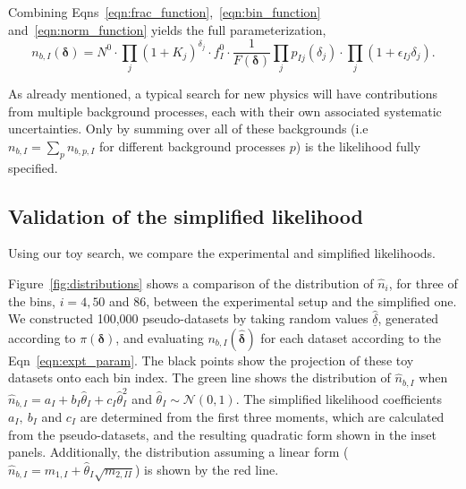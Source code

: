 \documentclass[11pt]{article}
\begin{document}
Combining Eqns~\ref{eqn:frac_function},~\ref{eqn:bin_function} and~\ref{eqn:norm_function} yields the full parameterization,
%
\begin{equation}
 n_{b,I}(\bm{\delta}) = N^{0}\cdot \prod_{j}(1+K_{j})^{\delta_{j}} \cdot f^{0}_{I} \cdot\frac{1}{F(\bm{\delta})} \prod_{j} p_{Ij}(\delta_{j}) \cdot \prod_{j} (1+\epsilon_{Ij}\delta_{j}).
\label{eqn:expt_param}
\end{equation}

As already mentioned, a typical search for new physics will have contributions from multiple background processes, each with their own associated systematic uncertainties.
Only by summing over all of these backgrounds (i.e $n_{b,I}=\sum_{p}n_{b,p,I}$ for different background processes $p$) is the likelihood fully specified.


\subsection{Validation of the simplified likelihood}

Using our toy search, we compare the experimental and simplified likelihoods. 

Figure~\ref{fig:distributions} shows a comparison of the distribution of $\hat{n}_{i}$, for three of the bins, $i=4,50$ and $86$, between the experimental setup and the simplified one.
We constructed 100,000 pseudo-datasets by taking random values $\underline{\hat{\delta}}$, generated according to $\pi(\bm{\delta})$, and evaluating
$n_{b,I}(\hat{\bm{\delta}})$ for each dataset according to the Eqn~\ref{eqn:expt_param}. The black points show the projection of these toy datasets onto each bin index. The green line shows the
distribution of $\hat{n}_{b,I}$ when $\hat{n}_{b,I} = a_{I}+b_{I}\hat{\theta}_{I}+c_{I}\hat{\theta}_{I}^{2}$  and $\hat{\theta}_{I}\sim\mathcal{N}(0,1)$. The simplified likelihood coefficients
$a_{I},~b_{I}$ and $c_{I}$ are determined from the first three moments, which are calculated from the pseudo-datasets, and the resulting quadratic form shown in the inset panels. Additionally, the distribution
assuming a linear form ($\hat{n}_{b,I} = m_{1,I}+\hat{\theta}_{I}\sqrt{m_{2,II}}$) is shown by the red line.
\end{document}
